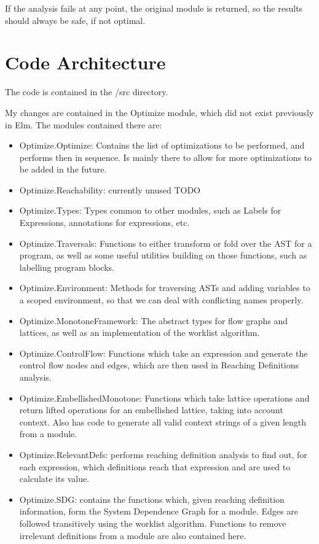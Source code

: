 \documentclass{article}
\begin{document}
If the analysis fails at any point, the original module is returned, so the results should always be safe, if not optimal.

\section{Code Architecture}

The code is contained in the /src directory.

My changes are contained in the Optimize module, which did not exist previously in Elm. The modules contained there are:

\begin{itemize}
\item
  Optimize.Optimize: Contains the list of optimizations to be performed, and performs then in sequence. Is mainly there to allow for more optimizations to be added in the future.
\item
  Optimize.Reachability: currently unused TODO
\item
  Optimize.Types: Types common to other modules, such as Labels for Expressions, annotations for expressions, etc.
\item
  Optimize.Traversals: Functions to either transform or fold over the AST for a program, as well as some useful utilities building on those functions, such as labelling program blocks.
\item
  Optimize.Environment: Methods for traversing ASTs and adding variables to a scoped environment, so that we can deal with conflicting names properly.
\item
  Optimize.MonotoneFramework: The abstract types for flow graphs and lattices, as well as an implementation of the worklist algorithm.
\item
  Optimize.ControlFlow: Functions which take an expression and generate the control flow nodes and edges, which are then used in Reaching Definitions analysis.
\item
  Optimize.EmbellishedMonotone: Functions which take lattice operations and return lifted operations for an embellished lattice, taking into account context. Also has code to generate all valid context strings of a given length from a module.
\item
  Optimize.RelevantDefs: performs reaching definition analysis to find out, for each expression, which definitions reach that expression and are used to calculate its value.
\item
  Optimize.SDG: contains the functions which, given reaching definition information, form the System Dependence Graph for a module. Edges are followed transitively using the worklist algorithm. Functions to remove irrelevant definitions from a module are also contained here.
\end{itemize}
\end{document}
